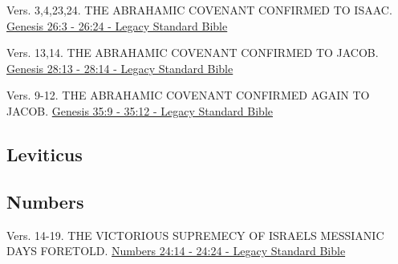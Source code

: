 \documentclass[
  ignorenonframetext,
]{beamer}
\begin{document}
\begin{frame}{26}
\label{section-4}
\begin{block}{Vers. 3,4,23,24. THE ABRAHAMIC COVENANT CONFIRMED TO
ISAAC.}
\label{vers.-342324.-the-abrahamic-covenant-confirmed-to-isaac.}
\href{https://read.lsbible.org/?q=gen26\%3A3-24}{Genesis 26:3 - 26:24 -
Legacy Standard Bible}
\end{block}
\end{frame}

\begin{frame}{28}
\label{section-5}
\begin{block}{Vers. 13,14. THE ABRAHAMIC COVENANT CONFIRMED TO JACOB.}
\label{vers.-1314.-the-abrahamic-covenant-confirmed-to-jacob.}
\href{https://read.lsbible.org/?q=gen28\%3A13-14}{Genesis 28:13 - 28:14
- Legacy Standard Bible}
\end{block}
\end{frame}

\begin{frame}{35}
\label{section-6}
\begin{block}{Vers. 9-12. THE ABRAHAMIC COVENANT CONFIRMED AGAIN TO
JACOB.}
\label{vers.-9-12.-the-abrahamic-covenant-confirmed-again-to-jacob.}
\href{https://read.lsbible.org/?q=gen35\%3A9-12}{Genesis 35:9 - 35:12 -
Legacy Standard Bible}
\end{block}
\end{frame}

\subsection{Leviticus}\label{leviticus}

\subsection{Numbers}\label{numbers}

\begin{frame}{24}
\label{section-7}
\begin{block}{Vers. 14-19. THE VICTORIOUS SUPREMECY OF
ISRAEL\textquotesingle S MESSIANIC DAYS FORETOLD.}
\label{vers.-14-19.-the-victorious-supremecy-of-israels-messianic-days-foretold.}
\href{https://read.lsbible.org/?q=num24\%3A14-24}{Numbers 24:14 - 24:24
- Legacy Standard Bible}
\end{block}
\end{frame}
\end{document}
